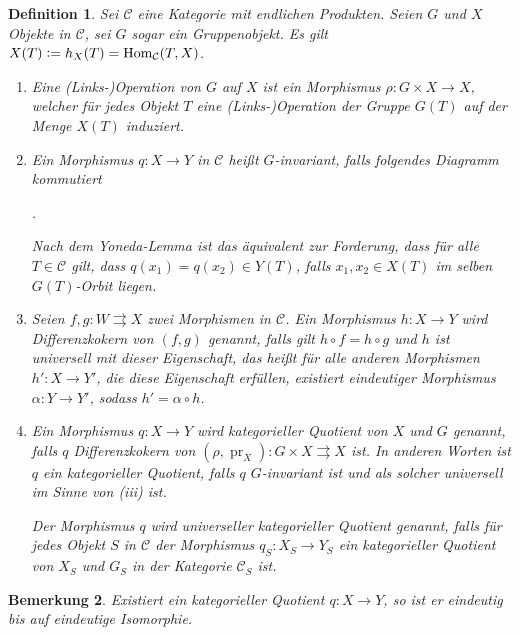 \documentclass[DIV11,11pt]{scrartcl}
\theoremstyle{Definitionen}
\newtheorem{Def}{Definition}[section]
\newtheorem{Bem}[Def]{Bemerkung}
\theoremstyle{Aussagen}
\newcommand{\coloneq}{\ensuremath{\mathrel{\mathop{\raisebox{0.5pt}{:}}}=}}
\DeclareMathOperator{\Hom}{Hom}
\DeclareMathOperator{\pr}{pr}
\begin{document}
\begin{Def}\label{DefKatQuot}
Sei $\mathcal{C}$ eine Kategorie mit endlichen Produkten. Seien $G$ und $X$ Objekte in $\mathcal{C}$, sei $G$ sogar ein Gruppenobjekt. Es gilt $X(T)\coloneq h_X(T)=\Hom_{\mathcal{C}}(T,X)$.
\begin{enumerate}
\item Eine \textit{(Links-)Operation von $G$ auf $X$} ist ein Morphismus $\rho\colon G\times X\rightarrow X$, welcher für jedes Objekt $T$ eine (Links-)Operation der Gruppe $G(T)$ auf der Menge $X(T)$ induziert.
\item Ein Morphismus $q\colon X\rightarrow Y$ in $\mathcal{C}$ heißt \textit{$G$-invariant}, falls folgendes Diagramm kommutiert
\begin{center}.\end{center}
Nach dem Yoneda-Lemma ist das äquivalent zur Forderung, dass für alle $T\in\mathcal{C}$ gilt, dass $q(x_1)=q(x_2)\in Y(T)$, falls $x_1,x_2\in X(T)$ im selben $G(T)$-Orbit liegen.
\item Seien $f,g\colon W\rightrightarrows X$ zwei Morphismen in $\mathcal{C}$. Ein Morphismus $h\colon X\rightarrow Y$ wird \textit{Differenzkokern von $(f,g)$} genannt, falls gilt $h\circ f=h\circ g$ und $h$ ist universell mit dieser Eigenschaft, das heißt für alle anderen Morphismen $h'\colon X\rightarrow Y'$, die diese Eigenschaft erfüllen, existiert eindeutiger Morphismus $\alpha\colon Y\rightarrow Y'$, sodass $h'=\alpha\circ h$.
\item Ein Morphismus $q\colon X\rightarrow Y$ wird \textit{kategorieller Quotient von $X$ und $G$} genannt, falls $q$ Differenzkokern von $(\rho,\pr_X)\colon G\times X\rightrightarrows X$ ist. In anderen Worten ist $q$ ein kategorieller Quotient, falls $q$ $G$-invariant ist und als solcher universell im Sinne von (iii) ist.

Der Morphismus $q$ wird \textit{universeller kategorieller Quotient} genannt, falls für jedes Objekt $S$ in $\mathcal{C}$ der Morphismus $q_S\colon X_S\rightarrow Y_S$ ein kategorieller Quotient von $X_S$ und $G_S$ in der Kategorie $\mathcal{C}_S$ ist.
\end{enumerate}
\end{Def}

\begin{Bem}
Existiert ein kategorieller Quotient $q\colon X\rightarrow Y$, so ist er eindeutig bis auf eindeutige Isomorphie.
\end{Bem}
\end{document}
